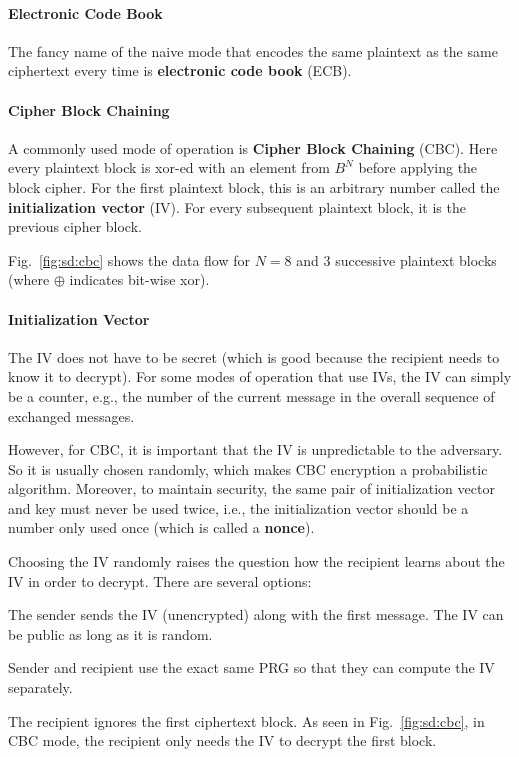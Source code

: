 \paragraph{Electronic Code Book}
The fancy name of the naive mode that encodes the same plaintext as the same ciphertext every time is \textbf{electronic code book} (ECB).

\paragraph{Cipher Block Chaining}
A commonly used mode of operation is \textbf{Cipher Block Chaining} (CBC).
Here every plaintext block is xor-ed with an element from $B^N$ before applying the block cipher.
For the first plaintext block, this is an arbitrary number called the \textbf{initialization vector} (IV).
For every subsequent plaintext block, it is the previous cipher block.

Fig.~\ref{fig:sd:cbc} shows the data flow for $N=8$ and $3$ successive plaintext blocks (where $\oplus$ indicates bit-wise xor).

\paragraph{Initialization Vector}
The IV does not have to be secret (which is good because the recipient needs to know it to decrypt).
For some modes of operation that use IVs, the IV can simply be a counter, e.g., the number of the current message in the overall sequence of exchanged messages.

However, for CBC, it is important that the IV is unpredictable to the adversary.
So it is usually chosen randomly, which makes CBC encryption a probabilistic algorithm.
Moreover, to maintain security, the same pair of initialization vector and key must never be used twice, i.e., the initialization vector should be a number only used once (which is called a \textbf{nonce}).

Choosing the IV randomly raises the question how the recipient learns about the IV in order to decrypt.
There are several options:
\begin{compactitem}
 \item The sender sends the IV (unencrypted) along with the first message. The IV can be public as long as it is random.
 \item Sender and recipient use the exact same PRG so that they can compute the IV separately.
 \item The recipient ignores the first ciphertext block. As seen in Fig.~\ref{fig:sd:cbc}, in CBC mode, the recipient only needs the IV to decrypt the first block.
\end{compactitem}

